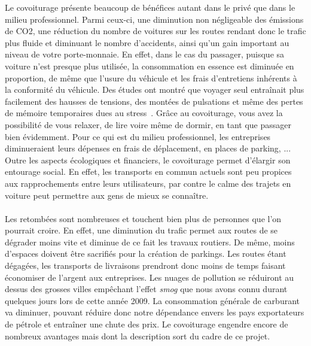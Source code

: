 \documentclass[12pt, a4paper, oneside]{article}
\begin{document}
    \indent Le covoiturage présente beaucoup de bénéfices autant dans le privé que dans le milieu professionnel. Parmi ceux-ci, une diminution non négligeable des émissions de CO2, une réduction du nombre de voitures sur les routes rendant donc le trafic plus fluide et diminuant le nombre d'accidents, ainsi qu'un gain important au niveau de votre porte-monnaie. En effet, dans le cas du passager, puisque sa voiture n'est presque plus utilisée, la consommation en essence est diminuée en proportion, de même que l'usure du véhicule et les frais d'entretiens inhérents à la conformité du véhicule. Des études ont montré que voyager seul entraînait plus facilement des hausses de tensions, des montées de pulsations et même des pertes de mémoire temporaires dues au stress~\cite{health-study}. Grâce au covoiturage, vous avez la possibilité de vous relaxer, de lire voire même de dormir, en tant que passager bien évidemment. Pour ce qui est du milieu professionnel, les entreprises diminueraient leurs dépenses en frais de déplacement, en places de parking, ... Outre les aspects écologiques et financiers, le covoiturage permet d'élargir son entourage social. En effet, les transports en commun actuels sont peu propices aux rapprochements entre leurs utilisateurs, par contre le calme des trajets en voiture peut permettre aux gens de mieux se connaître.\\\\
    \indent Les retombées sont nombreuses et touchent bien plus de personnes que l'on pourrait croire. En effet, une diminution du trafic permet aux routes de se dégrader moins vite et diminue de ce fait les travaux routiers. De même, moins d'espaces doivent être sacrifiés pour la création de parkings. Les routes étant dégagées, les transports de livraisons prendront donc moins de temps faisant économiser de l'argent aux entreprises. Les nuages de pollution se réduiront au dessus des grosses villes empêchant l'effet \textit{smog} que nous avons connu durant quelques jours lors de cette année 2009. La consommation générale de carburant va diminuer, pouvant réduire donc notre dépendance envers les pays exportateurs de pétrole et entraîner une chute des prix. Le covoiturage engendre encore de nombreux avantages mais dont la description sort du cadre de ce projet.\\\\
\end{document}

